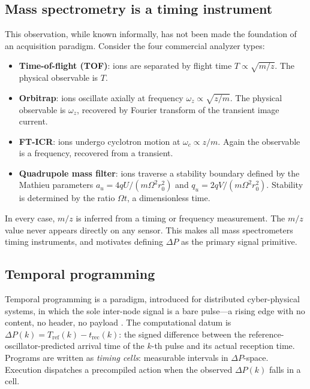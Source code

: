 \documentclass[twocolumn,10pt,a4paper]{article}
\theoremstyle{thmstyle}
\theoremstyle{definition}
\theoremstyle{remark}
\newcommand{\DP}{\Delta P}
\newcommand{\Tref}{T_{\mathrm{ref}}}
\newcommand{\trec}{t_{\mathrm{rec}}}
\begin{document}
\subsection{Mass spectrometry is a timing instrument}

This observation, while known informally, has not been made the
foundation of an acquisition paradigm. Consider the four commercial
analyzer types:

\begin{itemize}[nosep]
\item \textbf{Time-of-flight (TOF)}: ions are separated by flight time
  $T \propto \sqrt{m/z}$. The physical observable is $T$.
\item \textbf{Orbitrap}: ions oscillate axially at frequency
  $\omega_z \propto \sqrt{z/m}$. The physical observable is $\omega_z$,
  recovered by Fourier transform of the transient image current.
\item \textbf{FT-ICR}: ions undergo cyclotron motion at
  $\omega_c \propto z/m$. Again the observable is a frequency, recovered
  from a transient.
\item \textbf{Quadrupole mass filter}: ions traverse a stability boundary
  defined by the Mathieu parameters $a_u = 4qU/(m\Omega^2 r_0^2)$ and
  $q_u = 2qV/(m\Omega^2 r_0^2)$. Stability is determined by the
  ratio $\Omega t$, a dimensionless time.
\end{itemize}

In every case, $m/z$ is inferred from a timing or frequency measurement.
The $m/z$ value never appears directly on any sensor. This makes all
mass spectrometers timing instruments, and motivates defining $\DP$ as
the primary signal primitive.

\subsection{Temporal programming}

Temporal programming is a paradigm, introduced for distributed
cyber-physical systems, in which the sole inter-node signal is a bare
pulse---a rising edge with no content, no header, no payload
\citep{kopetz2011,lamport1978}. The computational datum is
$\DP(k) = \Tref(k) - \trec(k)$: the signed difference between the
reference-oscillator-predicted arrival time of the $k$-th pulse and its
actual reception time. Programs are written as \emph{timing cells}:
measurable intervals in $\DP$-space. Execution dispatches a precompiled
action when the observed $\DP(k)$ falls in a cell.
\end{document}
